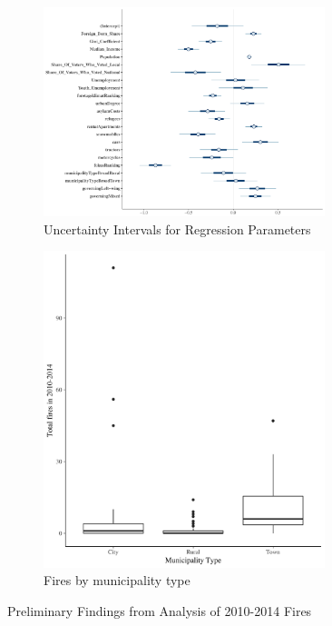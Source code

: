 \documentclass[10pt,a4paper, hidelinks]{article} %
\begin{document}
\begin{figure}[H]
	\centering
	\begin{subfigure}{.6\textwidth}
		\centering
		\includegraphics[width=0.9\textwidth]{../fig/parameterintervals}
		\caption{Uncertainty Intervals for Regression Parameters}
		\label{fig:sub1}
	\end{subfigure}%
	\begin{subfigure}{.4\textwidth}
	\centering
		\includegraphics[width=0.9\textwidth]{../fig/muni_type_fires.png}
		\caption{Fires by municipality type}
		\label{fig:sub2}
	\end{subfigure}
	\label{fig:test}
	\caption{Preliminary Findings from Analysis of 2010-2014 Fires}
\end{figure}
\end{document}
